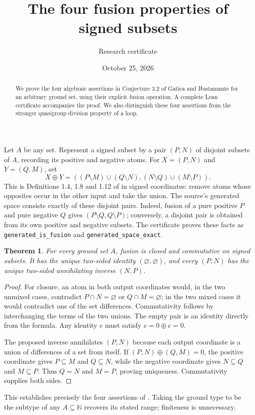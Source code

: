 \documentclass[11pt]{article}
\title{The four fusion properties of signed subsets}
\author{Research certificate}
\date{October 25, 2026}
\newtheorem{theorem}{Theorem}
\begin{document}
\maketitle
\begin{abstract}
We prove the four algebraic assertions in Conjecture 3.2 of Gatica and
Bustamante for an arbitrary ground set, using their explicit fusion operation.
A complete Lean certificate accompanies the proof. We also distinguish these
four assertions from the stronger quasigroup division property of a loop.
\end{abstract}
Let $A$ be any set. Represent a signed subset by a pair $(P,N)$ of disjoint
subsets of $A$, recording its positive and negative atoms. For $X=(P,N)$ and
$Y=(Q,M)$, set
\[
 X\oplus Y=((P\setminus M)\cup(Q\setminus N),
 (N\setminus Q)\cup(M\setminus P)).
\]
This is Definitions 1.4, 1.8 and 1.12 of \cite{GB} in signed coordinates:
remove atoms whose opposites occur in the other input and take the union.
The source's generated space consists exactly of these disjoint pairs.
Indeed, fusion of a pure positive $P$ and pure negative $Q$ gives
$(P\setminus Q,Q\setminus P)$; conversely, a disjoint pair is obtained from
its own positive and negative subsets. The certificate proves these facts
as \texttt{generated\_is\_fusion} and \texttt{generated\_space\_exact}.
\begin{theorem}
For every ground set $A$, fusion is closed and commutative on signed subsets.
It has the unique two-sided identity $(\varnothing,\varnothing)$, and every
$(P,N)$ has the unique two-sided annihilating inverse $(N,P)$.
\end{theorem}
\begin{proof}
For closure, an atom in both output coordinates would, in the two unmixed
cases, contradict $P\cap N=\varnothing$ or $Q\cap M=\varnothing$; in the two
mixed cases it would contradict one of the set differences. Commutativity
follows by interchanging the terms of the two unions. The empty pair is an
identity directly from the formula. Any identity $e$ must satisfy
$e=0\oplus e=0$.

The proposed inverse annihilates $(P,N)$ because each output coordinate is
a union of differences of a set from itself. If $(P,N)\oplus(Q,M)=0$, the
positive coordinate gives $P\subseteq M$ and $Q\subseteq N$, while the
negative coordinate gives $N\subseteq Q$ and $M\subseteq P$. Thus $Q=N$
and $M=P$, proving uniqueness. Commutativity supplies both sides.
\end{proof}
This establishes precisely the four assertions of \cite[Conjecture 3.2]{GB}.
Taking the ground type to be the subtype of any $A\subseteq\mathbb N$
recovers its stated range; finiteness is unnecessary.
\end{document}
